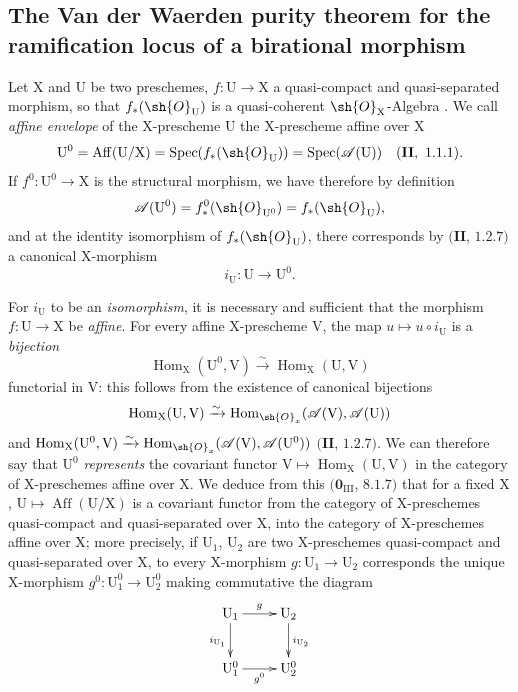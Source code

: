 \subsection{The Van der Waerden purity theorem for the ramification locus of a birational morphism}
\label{subsection:IV.21.12}

\begin{env}[21.12.1]
\label{IV.21.12.1}
Let $\mathrm{X}$ and $\mathrm{U}$ be two preschemes, $f:\mathrm{U}\to\mathrm{X}$ a quasi-compact and quasi-separated morphism, so that $f_*(\sh{O}_{\mathrm{U}})$ is a quasi-coherent $\sh{O}_{\mathrm{X}}$-Algebra .
We call \emph{affine envelope} of the $\mathrm{X}$-prescheme $\mathrm{U}$ the $\mathrm{X}$-prescheme affine over $\mathrm{X}$
\[
  \mathrm{U}^0=\operatorname{Aff}(\mathrm{U}/\mathrm{X})=\operatorname{Spec}(f_*(\sh{O}_{\mathrm{U}}))=\operatorname{Spec}(\mathscr{A}(\mathrm{U}))\quad(\mathbf{II},~1.1.1).
\]
If $f^0:\mathrm{U}^0\to\mathrm{X}$ is the structural morphism, we have therefore by definition
\[
  \mathscr{A}(\mathrm{U}^0)=f_*^0(\sh{O}_{\mathrm{U}^0})=f_*(\sh{O}_{\mathrm{U}}),
\]
and at the identity isomorphism of $f_*(\sh{O}_{\mathrm{U}})$, there corresponds by $(\mathbf{II}$, $1.2.7)$ a canonical $\mathrm{X}$-morphism
\[
\label{IV.21.12.1.1}
  i_{\mathrm{U}}:\mathrm{U}\to\mathrm{U}^0.
  \tag{21.12.1.1}
\]

For $i_{\mathrm{U}}$ to be an \emph{isomorphism}, it is necessary and sufficient that the morphism $f:\mathrm{U}\to\mathrm{X}$ be \emph{affine}.
For every affine $\mathrm{X}$-prescheme $\mathrm{V}$, the map $u\mapsto u\circ i_{\mathrm{U}}$ is a \emph{bijection}
\[
  \operatorname{Hom}_{\mathrm{X}}(\mathrm{U}^0,\mathrm{V})\xrightarrow{\sim}\operatorname{Hom}_{\mathrm{X}}(\mathrm{U},\mathrm{V})
\]
functorial in $\mathrm{V}$: this follows from the existence of canonical bijections
\[
  \operatorname{Hom}_{\mathrm{X}}(\mathrm{U},\mathrm{V})\xrightarrow{\sim}\operatorname{Hom}_{\sh{O}_x}(\mathscr{A}(\mathrm{V}),\mathscr{A}(\mathrm{U}))
\]
and $\operatorname{Hom}_{\mathrm{X}}(\mathrm{U}^0,\mathrm{V})\xrightarrow{\sim}\operatorname{Hom}_{\sh{O}_x}(\mathscr{A}(\mathrm{V}),\mathscr{A}(\mathrm{U}^0))$ $(\mathbf{II}$, $1.2.7)$.
We can therefore say that $\mathrm{U}^0$ \emph{represents} the covariant functor $\mathrm{V}\mapsto\operatorname{Hom}_{\mathrm{X}}(\mathrm{U},\mathrm{V})$ in the category of X-preschemes affine over $\mathrm{X}$.
We deduce from this $(\mathbf{0}_{\mathrm{III}}$, $8.1.7)$ that for a fixed $\mathrm{X}$, $\mathrm{U}\mapsto\operatorname{Aff}(\mathrm{U}/\mathrm{X})$ is a covariant functor from the category of $\mathrm{X}$-preschemes quasi-compact and quasi-separated over $\mathrm{X}$, into the category of $\mathrm{X}$-preschemes affine over $\mathrm{X}$; more precisely, if $\mathrm{U}_1$, $\mathrm{U}_2$ are two $\mathrm{X}$-preschemes quasi-compact and quasi-separated over $\mathrm{X}$, to every $\mathrm{X}$-morphism $g:\mathrm{U}_1\to\mathrm{U}_2$ corresponds the unique $\mathrm{X}$-morphism $g^0:\mathrm{U}_1^0\to\mathrm{U}_2^0$ making commutative the diagram
\[
  \xymatrix{
    \mathrm{U}_1 \ar[r]^g \ar[d]_{i_{\mathrm{U}_1}} & \mathrm{U}_2 \ar[d]^{i_{\mathrm{U}_2}} \\
    \mathrm{U}_1^0 \ar[r]_{g^0} & \mathrm{U}_2^0
  }
\]
\end{env}

